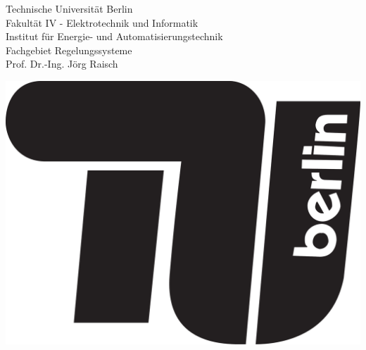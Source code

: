 
\begin{titlingpage}
	\noindent
	\begin{minipage}[t]{\textwidth}
		\flushright
		\begin{minipage}[c]{0.6\linewidth}
			\flushright
			\begin{SingleSpace}
				Technische Universität Berlin \\
				Fakultät IV - Elektrotechnik und Informatik  \\
				Institut für Energie- und Automatisierungstechnik \\
				Fachgebiet Regelungssysteme  \\
				Prof. Dr.-Ing. Jörg Raisch
			\end{SingleSpace}
		\end{minipage}
		\hspace{2em}
		\begin{minipage}[c]{3.2cm}
			\includegraphics[width=1\linewidth]{img/tu-logo}
		\end{minipage}
	\end{minipage}
	
	\vfill

	\begin{center}
	\LARGE \textsc{\thesubject}
	\end{center}
	
	~
	
	\begin{Spacing}{3}
		\centering\textsc{\huge\thetitle}
	\end{Spacing}
	

\end{titlingpage}

